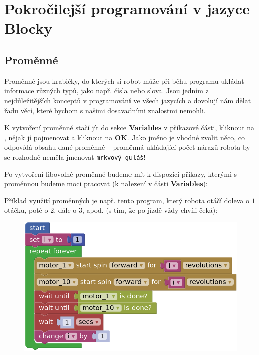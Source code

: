 \documentclass[../main.tex]{subfiles}
\begin{document}
	\section{Pokročilejší programování v jazyce Blocky}

	\subsection{Proměnné}
	Proměnné jsou krabičky, do kterých si robot může při běhu programu ukládat informace různých typů, jako např. čísla nebo slova. Jsou jedním z nejdůležitějších konceptů v programování ve všech jazycích a dovolují nám dělat řadu věcí, které bychom s našimi dosavadními znalostmi nemohli.

	K vytvoření proměnné stačí jít do sekce \textbf{Variables} v příkazové části, kliknout na , nějak jí pojmenovat a kliknout na \textbf{OK}. Jako jméno je vhodné zvolit něco, co odpovídá obsahu dané proměnné -- proměnná ukládající počet nárazů robota by se rozhodně neměla jmenovat \texttt{mrkvový\_guláš}!

	Po vytvoření libovolné proměnné budeme mít k dispozici příkazy, kterými s proměnnou budeme moci pracovat (k nalezení v části \textbf{Variables}):
	\begin{itemize}
		\blockVariableChange
		\blockVariableGet
		\blockVariableSet
	\end{itemize}

	 Příklad využití proměnných je např. tento program, který robota otáčí doleva o $1$ otáčku, poté o $2$, dále o $3$, apod. (s tím, že po jízdě vždy chvíli čeká):

	\begin{figure}[h!]
		\centering
		\begin{minipage}{0.5\textwidth}
			\includegraphics[width=\linewidth]{Images/05/variable-program.png}
		\end{minipage}
	\end{figure}
\end{document}
